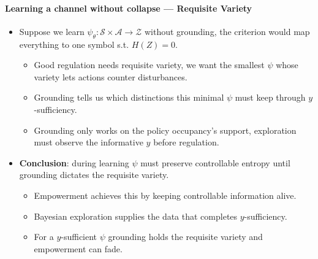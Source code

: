 \documentclass[10pt]{article}
\begin{document}
\paragraph{Learning a channel without collapse --- Requisite Variety}
\begin{itemize}
  \item Suppose we learn $\psi_\theta: \mathcal S \times \mathcal A \rightarrow \mathcal Z$ without grounding, the criterion would map everything to one symbol s.t. $H(Z) = 0$.
  \begin{itemize}
    \item Good regulation needs requisite variety, we want the smallest $\psi$ whose variety lets actions counter disturbances.
    \item Grounding tells us which distinctions this minimal $\psi$ must keep through $y$-sufficiency.
    \item Grounding only works on the policy occupancy's support, exploration must observe the informative $y$ before regulation.
  \end{itemize}
  \item \textbf{Conclusion}: during learning $\psi$ must preserve controllable entropy until grounding dictates the requisite variety.
  \begin{itemize}
    \item Empowerment achieves this by keeping controllable information alive.
    \item Bayesian exploration supplies the data that completes $y$-sufficiency.
    \item For a $y$-sufficient $\psi$ grounding holds the requisite variety and empowerment can fade. 
  \end{itemize}
\end{itemize}
\end{document}

